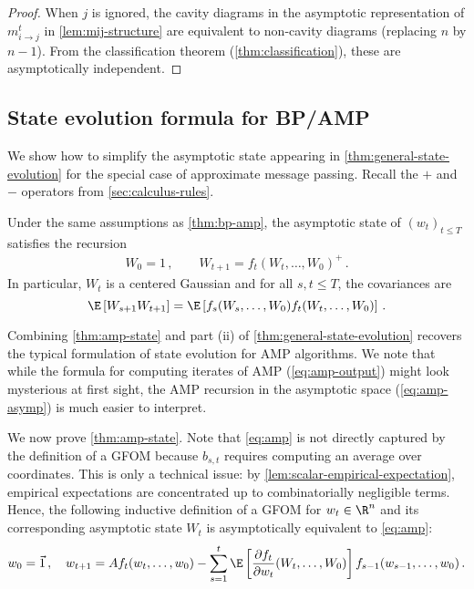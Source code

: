 \documentclass[12pt]{article}
\begin{document}
\begin{proof}
    When $j$ is ignored, the cavity diagrams in the asymptotic representation of $m_{i \to j}^t$ in \cref{lem:mij-structure} are equivalent to non-cavity diagrams (replacing $n$ by $n-1$).
    From the classification theorem (\cref{thm:classification}), these
    are asymptotically independent.
\end{proof}

\subsection{State evolution formula for BP/AMP}
\label{sec:amp}

We show how to simplify
the asymptotic state appearing in 
\cref{thm:general-state-evolution}
for the special case of approximate message
passing.
Recall the $+$ and $-$ operators from \cref{sec:calculus-rules}.

\begin{theorem}
    \label{thm:amp-state}
    Under the same assumptions as \cref{thm:bp-amp}, the asymptotic state of $(w_t)_{t\le T}$ satisfies the recursion
    \begin{align}
        W_0 = 1\,,\qquad W_{t+1} = f_{t}(W_{t},\ldots,W_0)^+\,.\label{eq:amp-asymp}
    \end{align}
    In particular, $W_t$ is a centered Gaussian and for all $s,t\le T$, the covariances are
    \[
        \E \left[W_{s+1} W_{t+1}\right]= \E \left[f_s(W_s,\ldots,W_0) f_t(W_t,\ldots,W_0)\right]\,.
    \]
\end{theorem}

Combining \cref{thm:amp-state} and part (ii) of \cref{thm:general-state-evolution} recovers the typical formulation of state evolution for AMP algorithms. We note that while the formula for
computing iterates of AMP (\cref{eq:amp-output}) might look mysterious
at first sight, the AMP recursion in the
asymptotic space (\cref{eq:amp-asymp}) is much
easier to interpret.


We now prove \cref{thm:amp-state}.
Note that \cref{eq:amp} is not directly captured by the definition of a GFOM because $b_{s,t}$ requires computing an average over coordinates. This is only a technical issue: by \cref{lem:scalar-empirical-expectation}, empirical expectations are concentrated up to combinatorially negligible terms. 
Hence, the following inductive definition of a GFOM for $w_t\in\R^n$ and its corresponding asymptotic state $W_t$ is asymptotically equivalent to \cref{eq:amp}:
\begin{align}
    w_0=\vec{1}\,,\quad w_{t+1} = Af_t(w_t,\ldots,w_0) - \sum_{s=1}^t \E\left[\frac {\partial f_t}{\partial w_t}(W_t,\ldots,W_0)\right] f_{s-1}(w_{s-1},\ldots,w_0)\,.\label{eq:new-amp}
\end{align}
\end{document}
